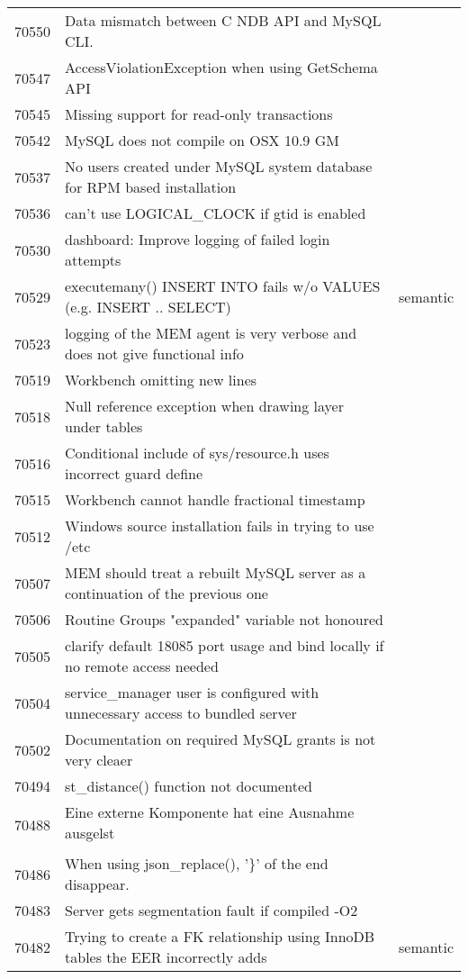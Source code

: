 \begin{longtable}[c]{p{1cm}p{10cm}p{1cm}}
70550 & Data mismatch between C NDB API and MySQL CLI. &  \\
70547 & AccessViolationException when using GetSchema API &  \\
70545 & Missing support for read-only transactions &  \\
70542 & MySQL does not compile on OSX 10.9 GM &  \\
70537 & No users created under MySQL system database for RPM based installation &  \\
70536 & can't use LOGICAL\_CLOCK if gtid is enabled &  \\
70530 & dashboard: Improve logging of failed login attempts &  \\
70529 & executemany() INSERT INTO fails w/o VALUES (e.g. INSERT .. SELECT) & semantic \\
70523 & logging of the MEM agent is very verbose and does not give functional info &  \\
70519 & Workbench omitting new lines &  \\
70518 & Null reference exception when drawing layer under tables &  \\
70516 & Conditional include of sys/resource.h uses incorrect guard define &  \\
70515 & Workbench cannot handle fractional timestamp &  \\
70512 & Windows source installation fails in trying to use /etc &  \\
70507 & MEM should treat a rebuilt MySQL server as a continuation of the previous one &  \\
70506 & Routine Groups "expanded" variable not honoured &  \\
70505 & clarify default 18085 port usage and bind locally if no remote access needed &  \\
70504 & service\_manager user is configured with unnecessary access to bundled server &  \\
70502 & Documentation on required MySQL grants is not very cleaer &  \\
70494 & st\_distance() function not documented &  \\
70488 & Eine externe Komponente hat eine Ausnahme ausgelst &  \\
70486 & When using json\_replace(), '\}' of the end disappear. &  \\
70483 & Server gets segmentation fault if compiled -O2 &  \\
70482 & Trying to create a FK relationship using InnoDB tables the EER incorrectly adds & semantic \\

\end{longtable}
